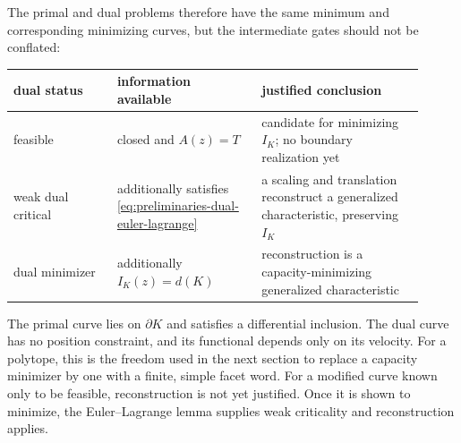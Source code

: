 The primal and dual problems therefore have the same minimum and corresponding
minimizing curves, but the intermediate gates should not be conflated:
\begin{center}
\small
\begin{tabular}{@{}p{0.23\linewidth}p{0.32\linewidth}p{0.36\linewidth}@{}}
\toprule
dual status & information available & justified conclusion \\
\midrule
feasible & closed and \(A(z)=T\) & candidate for minimizing \(I_K\); no
boundary realization yet \\
weak dual critical & additionally satisfies
\eqref{eq:preliminaries-dual-euler-lagrange} & a scaling and translation
reconstruct a generalized characteristic, preserving \(I_K\) \\
dual minimizer & additionally \(I_K(z)=d(K)\) & reconstruction is a
capacity-minimizing generalized characteristic \\
\bottomrule
\end{tabular}
\end{center}
The primal curve lies on \(\partial K\) and satisfies a differential
inclusion.  The dual curve has no position constraint, and its functional
depends only on its velocity.  For a polytope, this is the freedom used in the
next section to replace a capacity minimizer by one with a finite, simple
facet word.  For a modified curve known only to be feasible, reconstruction
is not yet justified.  Once it is shown to minimize, the Euler--Lagrange lemma
supplies weak criticality and reconstruction applies.
